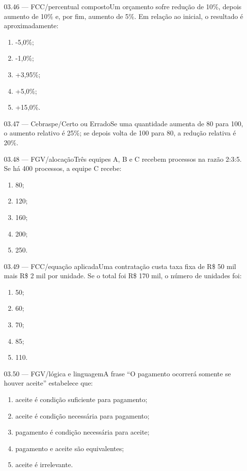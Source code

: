 \begin{questao}{ 03.46 — FCC/percentual composto}Um orçamento sofre redução de 10\%, depois aumento de 10\% e, por fim, aumento de 5\%. Em relação ao inicial, o resultado é aproximadamente:\begin{enumerate}[label=\Alph*)]\item -5,0\%;\item -1,0\%;\item +3,95\%;\item +5,0\%;\item +15,0\%.\end{enumerate}\end{questao}
\begin{questao}{ 03.47 — Cebraspe/Certo ou Errado}Se uma quantidade aumenta de 80 para 100, o aumento relativo é 25\%; se depois volta de 100 para 80, a redução relativa é 20\%.\end{questao}
\begin{questao}{ 03.48 — FGV/alocação}Três equipes A, B e C recebem processos na razão 2:3:5. Se há 400 processos, a equipe C recebe:\begin{enumerate}[label=\Alph*)]\item 80;\item 120;\item 160;\item 200;\item 250.\end{enumerate}\end{questao}
\begin{questao}{ 03.49 — FCC/equação aplicada}Uma contratação custa taxa fixa de R\$ 50 mil mais R\$ 2 mil por unidade. Se o total foi R\$ 170 mil, o número de unidades foi:\begin{enumerate}[label=\Alph*)]\item 50;\item 60;\item 70;\item 85;\item 110.\end{enumerate}\end{questao}
\begin{questao}{ 03.50 — FGV/lógica e linguagem}A frase ``O pagamento ocorrerá somente se houver aceite'' estabelece que:\begin{enumerate}[label=\Alph*)]\item aceite é condição suficiente para pagamento;\item aceite é condição necessária para pagamento;\item pagamento é condição necessária para aceite;\item pagamento e aceite são equivalentes;\item aceite é irrelevante.\end{enumerate}\end{questao}
